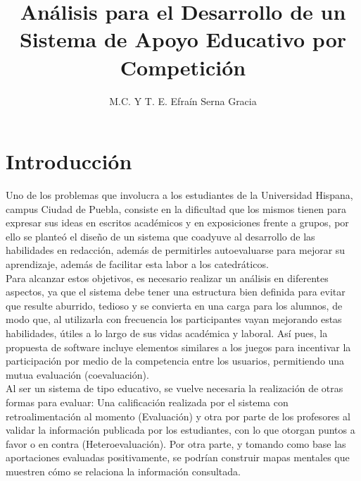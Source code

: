 \documentclass[12pt]{article} %
\title{Análisis para el Desarrollo de un Sistema de Apoyo Educativo por Competición}
\author{M.C. Y T. E. Efraín Serna Gracia}
\begin{document}
\maketitle

\tableofcontents

\section{Introducción}
Uno de los problemas que involucra a los estudiantes de la Universidad Hispana, campus Ciudad de Puebla, consiste en la dificultad que los mismos tienen para expresar sus ideas en escritos académicos y en exposiciones frente a grupos, por ello se planteó el diseño de un sistema que coadyuve al desarrollo de las habilidades en redacción, además de permitirles autoevaluarse para mejorar su aprendizaje, además de facilitar esta labor a los catedráticos.\\
Para alcanzar estos objetivos, es necesario realizar un análisis en diferentes aspectos, ya que el sistema debe tener una estructura bien definida para evitar que resulte aburrido, tedioso y se convierta en una carga para los alumnos, de modo que, al utilizarla con frecuencia los participantes vayan mejorando estas habilidades, útiles a lo largo de sus vidas académica y laboral. Así pues, la propuesta de software incluye elementos similares a los juegos para incentivar la participación por medio de la competencia entre los usuarios, permitiendo una mutua evaluación (coevaluación).\\
Al ser un sistema de tipo educativo, se vuelve necesaria la realización de otras formas para evaluar: Una calificación realizada por el sistema con retroalimentación al momento (Evaluación) y otra por parte de los profesores al validar la información publicada por los estudiantes, con lo que otorgan puntos a favor o en contra (Heteroevaluación). Por otra parte, y tomando como base las aportaciones evaluadas positivamente, se podrían construir mapas mentales que muestren cómo se relaciona la información consultada.
\end{document}
